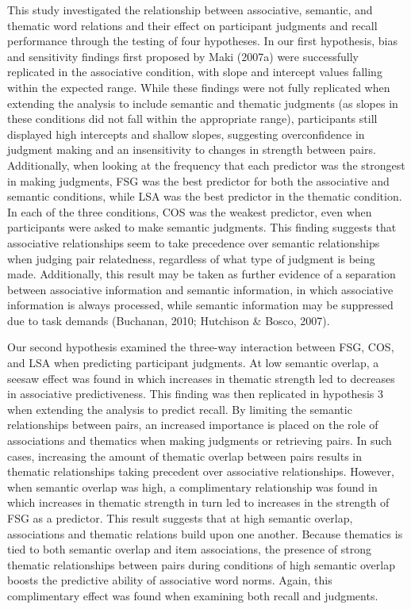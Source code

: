 \documentclass[english,man]{apa6}
\theoremstyle{definition}
\theoremstyle{definition}
\theoremstyle{definition}
\theoremstyle{remark}
\begin{document}
This study investigated the relationship between associative, semantic,
and thematic word relations and their effect on participant judgments
and recall performance through the testing of four hypotheses. In our
first hypothesis, bias and sensitivity findings first proposed by Maki
(2007a) were successfully replicated in the associative condition, with
slope and intercept values falling within the expected range. While
these findings were not fully replicated when extending the analysis to
include semantic and thematic judgments (as slopes in these conditions
did not fall within the appropriate range), participants still displayed
high intercepts and shallow slopes, suggesting overconfidence in
judgment making and an insensitivity to changes in strength between
pairs. Additionally, when looking at the frequency that each predictor
was the strongest in making judgments, FSG was the best predictor for
both the associative and semantic conditions, while LSA was the best
predictor in the thematic condition. In each of the three conditions,
COS was the weakest predictor, even when participants were asked to make
semantic judgments. This finding suggests that associative relationships
seem to take precedence over semantic relationships when judging pair
relatedness, regardless of what type of judgment is being made.
Additionally, this result may be taken as further evidence of a
separation between associative information and semantic information, in
which associative information is always processed, while semantic
information may be suppressed due to task demands (Buchanan, 2010;
Hutchison \& Bosco, 2007).

Our second hypothesis examined the three-way interaction between FSG,
COS, and LSA when predicting participant judgments. At low semantic
overlap, a seesaw effect was found in which increases in thematic
strength led to decreases in associative predictiveness. This finding
was then replicated in hypothesis 3 when extending the analysis to
predict recall. By limiting the semantic relationships between pairs, an
increased importance is placed on the role of associations and thematics
when making judgments or retrieving pairs. In such cases, increasing the
amount of thematic overlap between pairs results in thematic
relationships taking precedent over associative relationships. However,
when semantic overlap was high, a complimentary relationship was found
in which increases in thematic strength in turn led to increases in the
strength of FSG as a predictor. This result suggests that at high
semantic overlap, associations and thematic relations build upon one
another. Because thematics is tied to both semantic overlap and item
associations, the presence of strong thematic relationships between
pairs during conditions of high semantic overlap boosts the predictive
ability of associative word norms. Again, this complimentary effect was
found when examining both recall and judgments.
\end{document}
